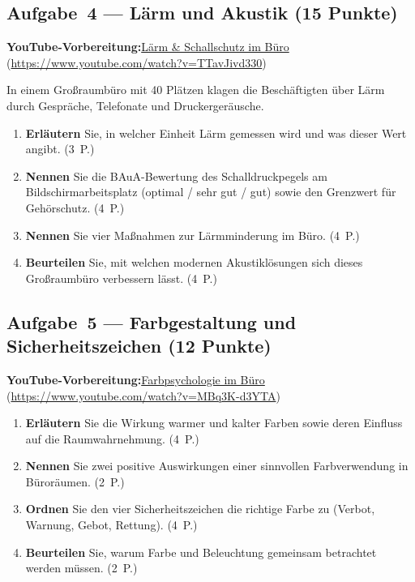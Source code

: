 \documentclass[11pt, a4paper]{article}
\begin{document}
\subsection*{Aufgabe~4 --- Lärm und Akustik (15 Punkte)}

\noindent\textbf{\color{bfwAccent}YouTube-Vorbereitung:}\enspace \href{https://www.youtube.com/watch?v=TTavJivd330}{Lärm \& Schallschutz im Büro} (\url{https://www.youtube.com/watch?v=TTavJivd330})

\medskip
In einem Großraumbüro mit 40 Plätzen klagen die Beschäftigten über Lärm durch Gespräche,
Telefonate und Druckergeräusche.

\begin{enumerate}[label=(\alph*)]
  \item \textbf{Erläutern} Sie, in welcher Einheit Lärm gemessen wird und was dieser Wert angibt. \hfill (3~P.)
  \item \textbf{Nennen} Sie die BAuA-Bewertung des Schalldruckpegels am Bildschirmarbeitsplatz (optimal / sehr gut / gut) sowie den Grenzwert für Gehörschutz. \hfill (4~P.)
  \item \textbf{Nennen} Sie vier Maßnahmen zur Lärmminderung im Büro. \hfill (4~P.)
  \item \textbf{Beurteilen} Sie, mit welchen modernen Akustiklösungen sich dieses Großraumbüro verbessern lässt. \hfill (4~P.)
\end{enumerate}

\subsection*{Aufgabe~5 --- Farbgestaltung und Sicherheitszeichen (12 Punkte)}

\noindent\textbf{\color{bfwAccent}YouTube-Vorbereitung:}\enspace \href{https://www.youtube.com/watch?v=MBq3K-d3YTA}{Farbpsychologie im Büro} (\url{https://www.youtube.com/watch?v=MBq3K-d3YTA})

\medskip
\begin{enumerate}[label=(\alph*)]
  \item \textbf{Erläutern} Sie die Wirkung warmer und kalter Farben sowie deren Einfluss auf die Raumwahrnehmung. \hfill (4~P.)
  \item \textbf{Nennen} Sie zwei positive Auswirkungen einer sinnvollen Farbverwendung in Büroräumen. \hfill (2~P.)
  \item \textbf{Ordnen} Sie den vier Sicherheitszeichen die richtige Farbe zu (Verbot, Warnung, Gebot, Rettung). \hfill (4~P.)
  \item \textbf{Beurteilen} Sie, warum Farbe und Beleuchtung gemeinsam betrachtet werden müssen. \hfill (2~P.)
\end{enumerate}
\end{document}
